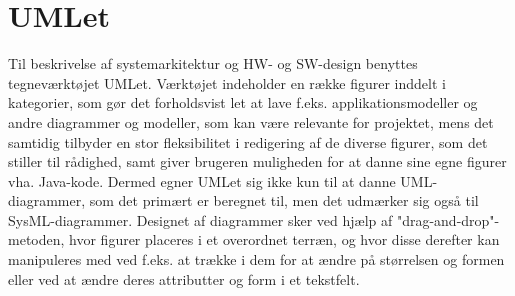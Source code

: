 	\section{UMLet}
	Til beskrivelse af systemarkitektur og HW- og SW-design benyttes tegneværktøjet UMLet. Værktøjet indeholder en række figurer inddelt i kategorier, som gør det forholdsvist let at lave f.eks. applikationsmodeller og andre diagrammer og modeller, som kan være relevante for projektet, mens det samtidig tilbyder en stor fleksibilitet i redigering af de diverse figurer, som det stiller til rådighed, samt giver brugeren muligheden for at danne sine egne figurer vha. Java-kode. Dermed egner UMLet sig ikke kun til at danne UML-diagrammer, som det primært er beregnet til, men det udmærker sig også til SysML-diagrammer. Designet af diagrammer sker ved hjælp af "drag-and-drop"-metoden, hvor figurer placeres i et overordnet terræn, og hvor disse derefter kan manipuleres med ved f.eks. at trække i dem for at ændre på størrelsen og formen eller ved at ændre deres attributter og form i et tekstfelt.
